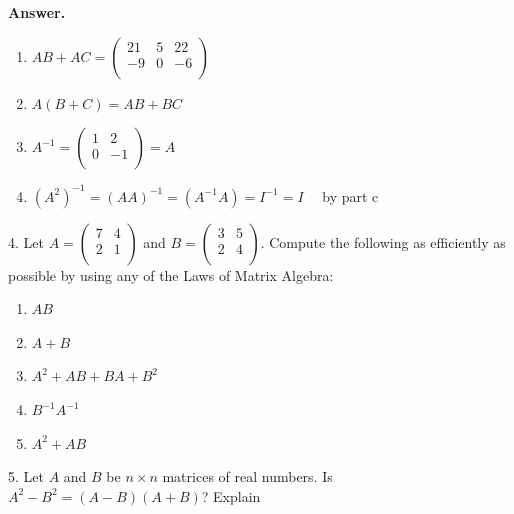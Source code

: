 \documentclass[10pt,]{book}
\theoremstyle{plain}
\theoremstyle{definition}
\theoremstyle{definition}
\theoremstyle{definition}
\theoremstyle{definition}
\begin{document}
\begin{exercisegroup}
%
\par\smallskip
\par\smallskip
\noindent\textbf{Answer.}\hypertarget{answer-11}{}\quad
\leavevmode%
\begin{enumerate}[label=\alph*]
\item\hypertarget{li-93}{} \(AB+AC=\left(
\begin{array}{ccc}
 21 & 5 & 22 \\
 -9 & 0 & -6 \\
\end{array}
\right)\)%
\item\hypertarget{li-94}{} \(A(B+C)=A B+ B C\)%
\item\hypertarget{li-95}{} \(A^{-1}=\left(
\begin{array}{cc}
 1 & 2 \\
 0 & -1 \\
\end{array}
\right)=A\)%
\item\hypertarget{li-96}{} \(\left(A^2\right)^{-1}=(AA)^{-1}=(A^{-1}A)=I^{-1}=I \quad \) by part c%
\end{enumerate}
%
\item[4.]\hypertarget{exercise-20}{} Let \(A =\left(
\begin{array}{cc}
 7 & 4 \\
 2 & 1 \\
\end{array}
\right)\) and \(B =\left(
\begin{array}{cc}
 3 & 5 \\
 2 & 4 \\
\end{array}
\right)\). Compute the following as efficiently as possible by using any of the Laws of Matrix Algebra:%
\par
\leavevmode%
\begin{enumerate}[label=\alph*]
\item\hypertarget{li-97}{} \(A B\) %
\item\hypertarget{li-98}{} \(A + B\) %
\item\hypertarget{li-99}{} \(A^2 + A B + B A + B ^2\)%
\item\hypertarget{li-100}{}  \(B^{-1}A^{-1}\)%
\item\hypertarget{li-101}{} \(A^2 + A B\)%
\end{enumerate}
%
\par\smallskip
\item[5.]\hypertarget{exercise-21}{} Let \(A\) and \(B\) be \(n\times n\) matrices of real numbers. Is \(A^2-B^2= (A-B)(A+B)\)?  Explain%
\par\smallskip
\end{exercisegroup}
\par\smallskip\noindent
\typeout{************************************************}
\typeout{************************************************}
\end{document}

